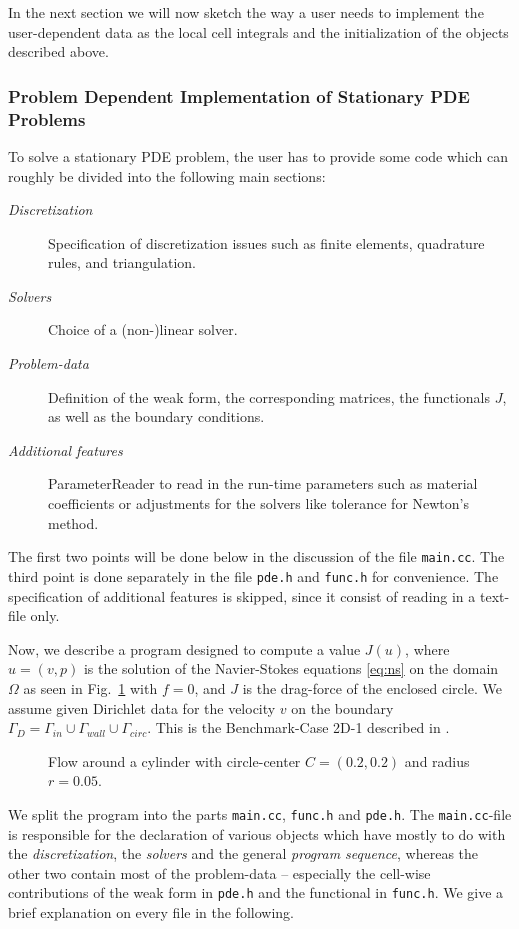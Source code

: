 \documentclass[smallextended]{svjour3}       %
\numberwithin{equation}{section}
\begin{document}
In the next section we will now sketch the way a user needs to implement the
user-dependent data as the local cell integrals and the initialization of the
objects described above.
\subsubsection{Problem Dependent Implementation of Stationary PDE Problems}
To solve a stationary PDE problem, the user has to provide some code which can roughly be divided into the following main sections:
\begin{description}
\item[\textit{Discretization}] 
Specification of discretization issues such as finite elements, 
quadrature rules, and triangulation.
\item[\textit{Solvers}] Choice of a (non-)linear solver. 
\item[\textit{Problem-data}] Definition of the weak form, 
the corresponding matrices, the functionals $J$, as well as the boundary 
conditions. 
\item[\textit{Additional features}] ParameterReader to read in the 
  run-time parameters
  such as material coefficients or adjustments for the solvers like tolerance
  for Newton's method. 
\end{description} 
The first two points will be done below in the discussion of the file 
\texttt{main.cc}. The third point is done separately in the file \texttt{pde.h}
and \texttt{func.h} for convenience. The specification of additional 
features is skipped, since it consist of reading in a text-file only. 

Now, we describe a program designed to compute a value 
$J(u)$, where $u=(v,p)$ is the solution of the Navier-Stokes 
equations \eqref{eq:ns} on the domain $\Omega$ as seen in 
Fig.~\ref{fig:example_ns} with  $f=0$, and $J$ is the drag-force 
of the enclosed circle. We assume given Dirichlet data for the velocity 
$v$ on the boundary $\Gamma_{D}=\Gamma_{in}\cup\Gamma_{wall}\cup\Gamma_{circ}$. 
This is the Benchmark-Case 2D-1 described in \cite{TuSchae96}.
\begin{figure}[h]
\centering
\resizebox{0.5\textwidth}{!}{}
\caption{Flow around a cylinder with 
circle-center $C=(0.2,0.2)$ and radius $r=0.05$.}
\label{fig:example_ns}
\end{figure}

We split the program into the parts \texttt{main.cc}, \texttt{func.h} and 
\texttt{pde.h}. The \texttt{main.cc}-file is responsible for the declaration 
of various objects which have mostly to do with the \textit{discretization}, 
the \textit{solvers} and the general \textit{program sequence}, whereas the 
other two contain most of the problem-data -- especially the cell-wise 
contributions of the weak form in \texttt{pde.h} and the functional in 
\texttt{func.h}. 
We give a brief explanation on every file in the following.
\end{document}
